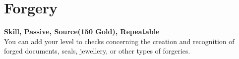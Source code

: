 \section{Forgery}\label{sec:forgery}
\textbf{Skill, Passive, Source(150 Gold), Repeatable}\\
You can add your level to checks concerning the creation and recognition of forged documents, seals, jewellery, or other types of forgeries.